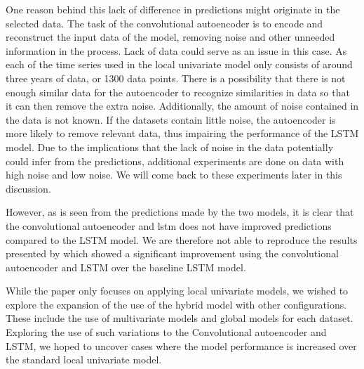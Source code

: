 One reason behind this lack of difference in predictions might originate in the selected data.
The task of the convolutional autoencoder is to encode and reconstruct the input data of the model,
removing noise and other unneeded information in the process.
Lack of data could serve as an issue in this case.
As each of the time series used in the local univariate model only consists of around three years of data, or 1300 data points.
There is a possibility that there is not enough similar data for the autoencoder to recognize similarities in data
so that it can then remove the extra noise.
Additionally, the amount of noise contained in the data is not known.
If the datasets contain little noise, the autoencoder is more likely to remove relevant data, thus impairing the performance of the LSTM model.
Due to the implications that the lack of noise in the data potentially could infer from the predictions,
additional experiments are done on data with high noise and low noise.
We will come back to these experiments later in this discussion.

However, as is seen from the predictions made by the two models, it is clear that the convolutional autoencoder and lstm
does not have improved predictions compared to the LSTM model.
We are therefore not able to reproduce the results presented by \cite{Zhao2019}
which showed a significant improvement using the convolutional autoencoder and LSTM over the baseline LSTM model.


While the paper \cite{Zhao2019} only focuses on applying local univariate models,
we wished to explore the expansion of the use of the hybrid model with other configurations.
These include the use of multivariate models and global models for each dataset.
Exploring the use of such variations to the Convolutional autoencoder and LSTM,
we hoped to uncover cases where the model performance is increased over the standard local univariate model.







